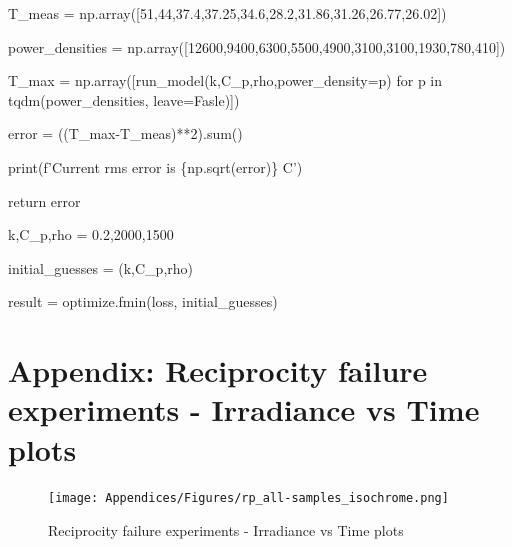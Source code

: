 \begin{appendices}
	\hspace{0.5cm} T\_meas = np.array([51,44,37.4,37.25,34.6,28.2,31.86,31.26,26.77,26.02])
	
	\hspace{0.5cm} power\_densities = np.array([12600,9400,6300,5500,4900,3100,3100,1930,780,410])
	
	\hspace{0.5cm} T\_max = np.array([run\_model(k,C\_p,rho,power\_density=p) for p in tqdm(power\_densities, leave=Fasle)])
	
	\hspace{0.5cm} error = ((T\_max-T\_meas)**2).sum()
	
	\hspace{0.5cm} print(f'Current rms error is \{np.sqrt(error)\} C')
	
	\hspace{0.5cm} return error
	
\vspace{1cm}

k,C\_p,rho = 0.2,2000,1500

initial\_guesses = (k,C\_p,rho)

result = optimize.fmin(loss, initial\_guesses)








\newpage
\section[\hspace{0.3cm}Reciprocity failure experiments - Irradiance vs Time plots]{ Appendix: Reciprocity failure experiments - Irradiance vs Time plots}
\label{app:ch3_rp_results_irr-time}


\begin{figure}[!h]
\centering
\texttt{[image: Appendices/Figures/rp\_all-samples\_isochrome.png]}
\caption*{Reciprocity failure experiments - Irradiance vs Time plots}
\end{figure}



\end{appendices}
